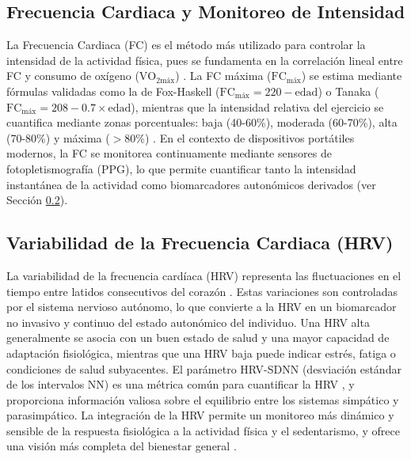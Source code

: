 \subsection{Frecuencia Cardiaca y Monitoreo de Intensidad}
\label{subsec:frecuencia_cardiaca}

La Frecuencia Cardiaca (FC) es el método más utilizado para controlar la intensidad de la actividad física, pues se fundamenta en la correlación lineal entre FC y consumo de oxígeno ($\mathrm{VO}_{2\text{máx}}$) \citep{Abellan2014Prescripcion}. La FC máxima ($\text{FC}_{\text{máx}}$) se estima mediante fórmulas validadas como la de Fox-Haskell ($\text{FC}_{\text{máx}} = 220 - \text{edad}$) o Tanaka ($\text{FC}_{\text{máx}} = 208 - 0.7 \times \text{edad}$), mientras que la intensidad relativa del ejercicio se cuantifica mediante zonas porcentuales: baja (40-60\%), moderada (60-70\%), alta (70-80\%) y máxima ($>$80\%) \citep{Fox1968Physical,Tanaka2001AgePredicted,Abellan2014Prescripcion}. En el contexto de dispositivos portátiles modernos, la FC se monitorea continuamente mediante sensores de fotopletismografía (PPG), lo que permite cuantificar tanto la intensidad instantánea de la actividad como biomarcadores autonómicos derivados (ver Sección \ref{subsec:hrv}).

\subsection{Variabilidad de la Frecuencia Cardiaca (HRV)}
\label{subsec:hrv}

La variabilidad de la frecuencia cardíaca (HRV) representa las fluctuaciones en el tiempo entre latidos consecutivos del corazón \citep{TaskForce1996,Quigley2024Publication}. Estas variaciones son controladas por el sistema nervioso autónomo, lo que convierte a la HRV en un biomarcador no invasivo y continuo del estado autonómico del individuo. Una HRV alta generalmente se asocia con un buen estado de salud y una mayor capacidad de adaptación fisiológica, mientras que una HRV baja puede indicar estrés, fatiga o condiciones de salud subyacentes. El parámetro HRV-SDNN (desviación estándar de los intervalos NN) es una métrica común para cuantificar la HRV \citep{Damoun2024HRV,Laborde2017}, y proporciona información valiosa sobre el equilibrio entre los sistemas simpático y parasimpático. La integración de la HRV permite un monitoreo más dinámico y sensible de la respuesta fisiológica a la actividad física y el sedentarismo, y ofrece una visión más completa del bienestar general \citep{Bonneval2025Validity}.

